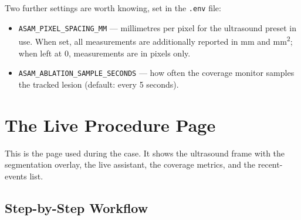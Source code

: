 \documentclass[11pt,a4paper]{article}
\newcommand{\code}[1]{\texttt{\small #1}}
\begin{document}
Two further settings are worth knowing, set in the \code{.env} file:

\begin{itemize}[leftmargin=1.4em]
  \item \code{ASAM\_PIXEL\_SPACING\_MM} --- millimetres per pixel for the
  ultrasound preset in use. When set, all measurements are additionally
  reported in mm and mm\textsuperscript{2}; when left at 0, measurements are
  in pixels only.
  \item \code{ASAM\_ABLATION\_SAMPLE\_SECONDS} --- how often the coverage
  monitor samples the tracked lesion (default: every 5 seconds).
\end{itemize}

\section{The Live Procedure Page}

This is the page used during the case. It shows the ultrasound frame with the
segmentation overlay, the live assistant, the coverage metrics, and the
recent-events list.

\subsection{Step-by-Step Workflow}
\end{document}
